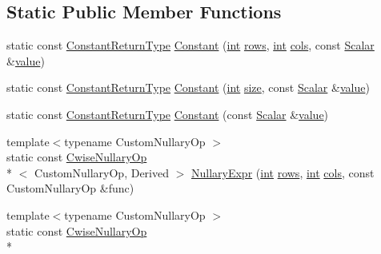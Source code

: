 \subsection*{Static Public Member Functions}
\begin{DoxyCompactItemize}
\item 
static const \hyperlink{class_matrix_base_aa9bcfa09043d1337c3575f008d3e04da}{Constant\-Return\-Type} \hyperlink{class_matrix_base_a06986b94e4841f54bb8c6bd9473f0798}{Constant} (\hyperlink{ioapi_8h_a787fa3cf048117ba7123753c1e74fcd6}{int} \hyperlink{class_matrix_base_ae82810ba95da637cdf434b4274083723}{rows}, \hyperlink{ioapi_8h_a787fa3cf048117ba7123753c1e74fcd6}{int} \hyperlink{class_matrix_base_abe5381b539f87237647bc651a1ac0364}{cols}, const \hyperlink{class_matrix_base_a625df8339dc2d816cbc0fd66e7dadaf5}{Scalar} \&\hyperlink{glext_8h_aa0e2e9cea7f208d28acda0480144beb0}{value})
\item 
static const \hyperlink{class_matrix_base_aa9bcfa09043d1337c3575f008d3e04da}{Constant\-Return\-Type} \hyperlink{class_matrix_base_a0c2a5c54f401d08e1f4513f317541afd}{Constant} (\hyperlink{ioapi_8h_a787fa3cf048117ba7123753c1e74fcd6}{int} \hyperlink{glext_8h_a014d89bd76f74ef3a29c8f04b473eb76}{size}, const \hyperlink{class_matrix_base_a625df8339dc2d816cbc0fd66e7dadaf5}{Scalar} \&\hyperlink{glext_8h_aa0e2e9cea7f208d28acda0480144beb0}{value})
\item 
static const \hyperlink{class_matrix_base_aa9bcfa09043d1337c3575f008d3e04da}{Constant\-Return\-Type} \hyperlink{class_matrix_base_aa1f103ef56ecb541c170aed267fbebfd}{Constant} (const \hyperlink{class_matrix_base_a625df8339dc2d816cbc0fd66e7dadaf5}{Scalar} \&\hyperlink{glext_8h_aa0e2e9cea7f208d28acda0480144beb0}{value})
\item 
{\footnotesize template$<$typename Custom\-Nullary\-Op $>$ }\\static const \hyperlink{class_cwise_nullary_op}{Cwise\-Nullary\-Op}\\*
$<$ Custom\-Nullary\-Op, Derived $>$ \hyperlink{class_matrix_base_abbe8a3418394b62b12ac1e965e34aabc}{Nullary\-Expr} (\hyperlink{ioapi_8h_a787fa3cf048117ba7123753c1e74fcd6}{int} \hyperlink{class_matrix_base_ae82810ba95da637cdf434b4274083723}{rows}, \hyperlink{ioapi_8h_a787fa3cf048117ba7123753c1e74fcd6}{int} \hyperlink{class_matrix_base_abe5381b539f87237647bc651a1ac0364}{cols}, const Custom\-Nullary\-Op \&func)
\item 
{\footnotesize template$<$typename Custom\-Nullary\-Op $>$ }\\static const \hyperlink{class_cwise_nullary_op}{Cwise\-Nullary\-Op}\\*

\end{DoxyCompactItemize}
